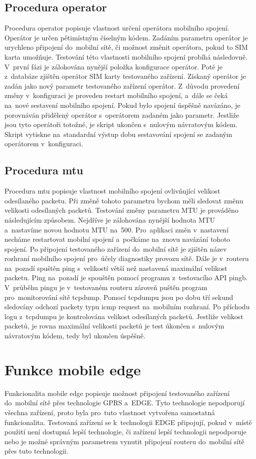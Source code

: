 \subsection{Procedura operator}
Procedura operator popisuje vlastnost určení operátora mobilního spojení. Operátor je určen pětimístným číselným kódem. Zadáním parametru operátor je urychleno připojení do~mobilní sítě, či možnost změnit operátora, pokud to SIM karta umožňuje. Testování této vlastnosti mobilního spojení probíhá následovně. V~první fázi je zálohována nynější položka konfigurace operátor. Poté je z~databáze zjištěn operátor SIM karty testovaného zařízení. Získaný operátor je zadán jako nový parametr testovaného zařízení operátor. Z~důvodu provedení změny v~konfiguraci je proveden restart mobilního spojení, a~dále se čeká na~nové sestavení mobilního spojení. Pokud bylo spojení úspěšně navázáno, je porovnáván přidělený operátor s~operátorem zadaném jako parametr. Jestliže jsou tyto operátoři totožné, je skript ukončen s~nulovým návratovým kódem. Skript vytiskne na~standardní výstup dobu sestavování spojení se zadaným operátorem v~konfiguraci.

\subsection{Procedura mtu}
Procedura mtu popisuje vlastnost mobilního spojení ovlivňující velikost odesílaného packetu. Při změně tohoto parametru bychom měli sledovat změnu velikosti odesílaných packetů. Testování změny parametru MTU je prováděno následujícím způsobem. Nejdříve je zálohována nynější hodnota MTU a~nastavíme novou hodnotu MTU na~500. Pro~aplikaci změn v~nastavení necháme restartovat mobilní spojení a~počkáme na~znovu navázání tohoto spojení. Po připojení testovaného zařízení do~mobilní sítě je zjištěn název rozhraní mobilního spojení pro~účely diagnostiky provozu sítě. Dále je v~routeru na~pozadí spuštěn ping s~velikostí větší než nastavená maximální velikost packetu. Ping na~pozadí je spouštěn pomocí programu z~testovacího API pingb. V~průběhu pingu je v~testovaném routeru zároveň puštěn program pro~monitorování sítě tcpdump. Pomocí tcpdumpu jsou po dobu tří sekund sledovány odchozí packety typu icmp request na~mobilním rozhraní. Po příchodu logu z~tcpdumpu je kontrolována velikost odesílaných packetů. Jestliže velikost packetů, je rovna maximální velikosti packetů je test úkončen s~nulovým návratovým kódem, tedy byl ukončen úspěšně.

\section{Funkce mobile edge}
Funkcionalita mobile edge popisuje možnost připojení testovaného zařízení do~mobilní sítě přes technologie GPRS a~EDGE. Tyto technologie nepodporují všechna zařízení, proto byla pro~tuto vlastnost vytvořena samostatná funkcionalita. Testovaná zařízení se k~technologii EDGE  připojují, pokud v~místě použití není dostupná lepší technologie, či zařízení lepší technologii nepodporuje nebo je možné správným parametrem vynutit připojení routeru do~mobilní sítě přes tuto technologii.

